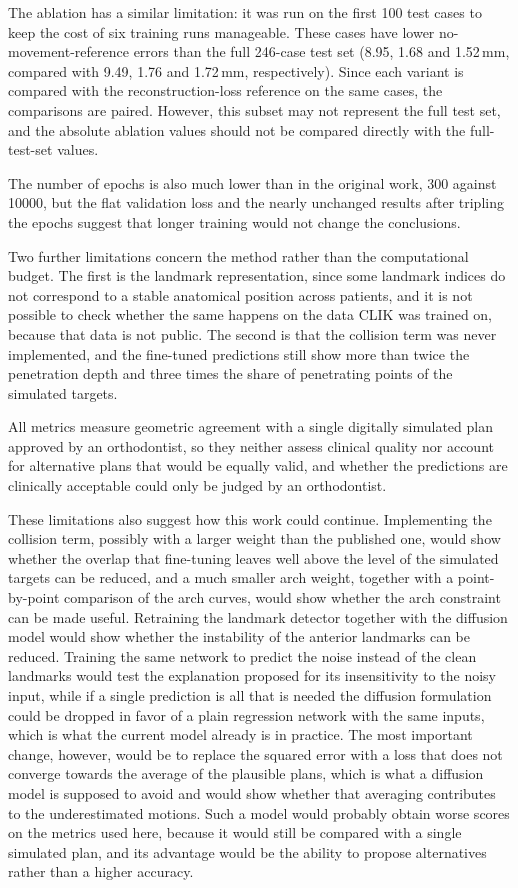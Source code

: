 \documentclass[10pt,a4paper]{article}
\begin{document}
The ablation has a similar limitation: it was run on the first 100 test cases to keep the cost of six training runs manageable. These cases have lower no-movement-reference errors than the full 246-case test set (8.95\degree{}, 1.68 and 1.52\,mm, compared with 9.49\degree{}, 1.76 and 1.72\,mm, respectively). Since each variant is compared with the reconstruction-loss reference on the same cases, the comparisons are paired. However, this subset may not represent the full test set, and the absolute ablation values should not be compared directly with the full-test-set values.

The number of epochs is also much lower than in the original work, 300 against 10000, but the flat validation loss and the nearly unchanged results after tripling the epochs suggest that longer training would not change the conclusions.

Two further limitations concern the method rather than the computational budget. The first is the landmark representation, since some landmark indices do not correspond to a stable anatomical position across patients, and it is not possible to check whether the same happens on the data CLIK was trained on, because that data is not public. The second is that the collision term was never implemented, and the fine-tuned predictions still show more than twice the penetration depth and three times the share of penetrating points of the simulated targets.

All metrics measure geometric agreement with a single digitally simulated plan approved by an orthodontist, so they neither assess clinical quality nor account for alternative plans that would be equally valid, and whether the predictions are clinically acceptable could only be judged by an orthodontist.

These limitations also suggest how this work could continue. Implementing the collision term, possibly with a larger weight than the published one, would show whether the overlap that fine-tuning leaves well above the level of the simulated targets can be reduced, and a much smaller arch weight, together with a point-by-point comparison of the arch curves, would show whether the arch constraint can be made useful. Retraining the landmark detector together with the diffusion model would show whether the instability of the anterior landmarks can be reduced. Training the same network to predict the noise instead of the clean landmarks would test the explanation proposed for its insensitivity to the noisy input, while if a single prediction is all that is needed the diffusion formulation could be dropped in favor of a plain regression network with the same inputs, which is what the current model already is in practice. The most important change, however, would be to replace the squared error with a loss that does not converge towards the average of the plausible plans, which is what a diffusion model is supposed to avoid and would show whether that averaging contributes to the underestimated motions. Such a model would probably obtain worse scores on the metrics used here, because it would still be compared with a single simulated plan, and its advantage would be the ability to propose alternatives rather than a higher accuracy.
\end{document}
